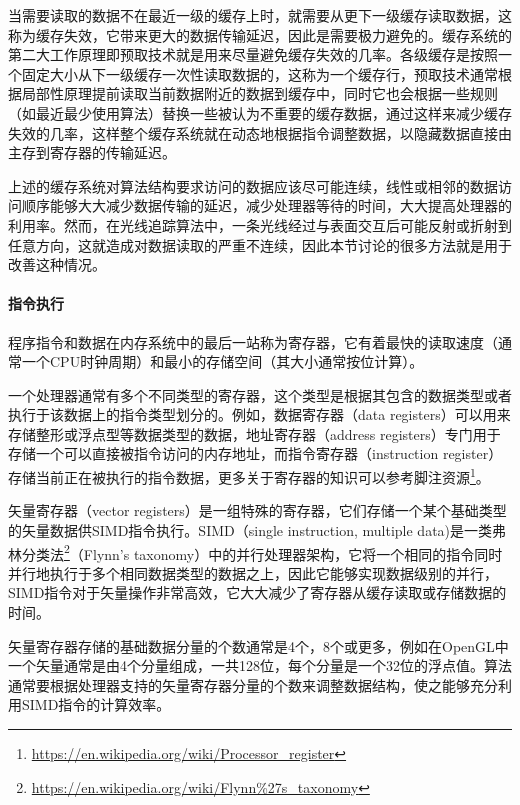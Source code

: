 当需要读取的数据不在最近一级的缓存上时，就需要从更下一级缓存读取数据，这称为缓存失效，它带来更大的数据传输延迟，因此是需要极力避免的。缓存系统的第二大工作原理即预取技术就是用来尽量避免缓存失效的几率。各级缓存是按照一个固定大小从下一级缓存一次性读取数据的，这称为一个缓存行，预取技术通常根据局部性原理提前读取当前数据附近的数据到缓存中，同时它也会根据一些规则（如最近最少使用算法）替换一些被认为不重要的缓存数据，通过这样来减少缓存失效的几率，这样整个缓存系统就在动态地根据指令调整数据，以隐藏数据直接由主存到寄存器的传输延迟。

上述的缓存系统对算法结构要求访问的数据应该尽可能连续，线性或相邻的数据访问顺序能够大大减少数据传输的延迟，减少处理器等待的时间，大大提高处理器的利用率。然而，在光线追踪算法中，一条光线经过与表面交互后可能反射或折射到任意方向，这就造成对数据读取的严重不连续，因此本节讨论的很多方法就是用于改善这种情况。





\paragraph{指令执行}
程序指令和数据在内存系统中的最后一站称为寄存器，它有着最快的读取速度（通常一个CPU时钟周期）和最小的存储空间（其大小通常按位计算）。

一个处理器通常有多个不同类型的寄存器，这个类型是根据其包含的数据类型或者执行于该数据上的指令类型划分的。例如，数据寄存器（data registers）可以用来存储整形或浮点型等数据类型的数据，地址寄存器（address registers）专门用于存储一个可以直接被指令访问的内存地址，而指令寄存器（instruction register）存储当前正在被执行的指令数据，更多关于寄存器的知识可以参考脚注资源\footnote{\url{https://en.wikipedia.org/wiki/Processor_register}}。

矢量寄存器（vector registers）是一组特殊的寄存器，它们存储一个某个基础类型的矢量数据供SIMD指令执行。SIMD（single instruction, multiple data)是一类弗林分类法\footnote{\url{https://en.wikipedia.org/wiki/Flynn\%27s\_taxonomy}}（Flynn's taxonomy）中的并行处理器架构，它将一个相同的指令同时并行地执行于多个相同数据类型的数据之上，因此它能够实现数据级别的并行，SIMD指令对于矢量操作非常高效，它大大减少了寄存器从缓存读取或存储数据的时间。

矢量寄存器存储的基础数据分量的个数通常是4个，8个或更多，例如在OpenGL中一个矢量通常是由4个分量组成，一共128位，每个分量是一个32位的浮点值。算法通常要根据处理器支持的矢量寄存器分量的个数来调整数据结构，使之能够充分利用SIMD指令的计算效率。
 
